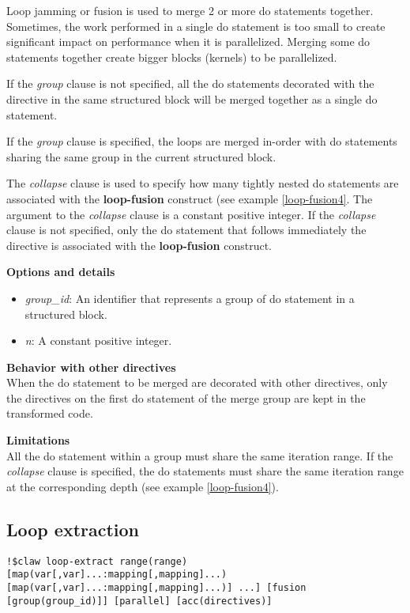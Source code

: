 \documentclass{article}
\begin{document}
Loop jamming or fusion is used to merge 2 or more do statements together. Sometimes, the
work performed in a single do statement is too small to create significant impact on
performance when it is parallelized. Merging some do statements together create bigger
blocks (kernels) to be parallelized.

If the \textit{group} clause is not specified, all the do statements decorated with the directive in the
same structured block will be merged together as a single do statement.

If the \textit{group} clause is specified, the loops are merged in-order with do statements sharing 
the same group in the current structured block.

The \textit{collapse} clause is used to specify how many tightly nested do statements are
associated with the \textbf{loop-fusion} construct (see example \ref{loop-fusion4}. The argument to the \textit{collapse}
clause is a constant positive integer. If the \textit{collapse} clause
is not specified, only the do statement that follows immediately the directive is associated with the \textbf{loop-fusion} construct.

\textbf{Options and details}
\begin{itemize}
\item \textit{group\_id}: An identifier that represents a group of do statement in a structured block. 
\item \textit{n}: A constant positive integer.
\end{itemize}

\textbf{Behavior with other directives}\\
When the do statement to be merged are decorated with other directives, only the
directives on the first do statement of the merge group are kept in the transformed
code.

\textbf{Limitations}\\
All the do statement within a group must share the same iteration range. If the
\textit{collapse} clause is specified, the do statements must share the same iteration range at the
corresponding depth (see example \ref{loop-fusion4}).

\subsection{Loop extraction}
\begin{lstlisting}
!$claw loop-extract range(range) [map(var[,var]...:mapping[,mapping]...) [map(var[,var]...:mapping[,mapping]...)] ...] [fusion [group(group_id)]] [parallel] [acc(directives)]
\end{lstlisting}
\end{document}
